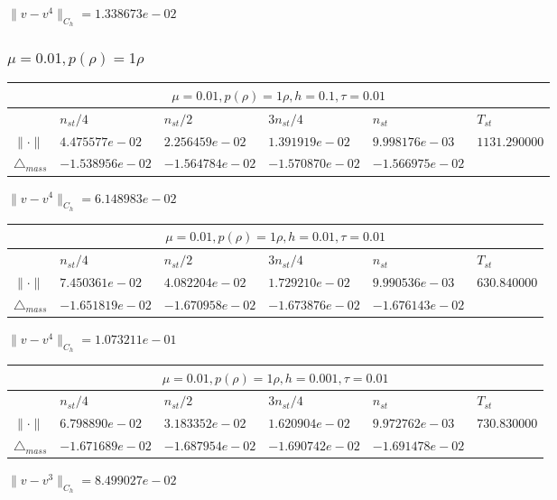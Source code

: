 \documentclass[12pt,a4paper]{article}
\begin{document}
$\|v-v^{4}\|_{C_h} = 1.338673e-02$

\subsubsection{$\mu = 0.01, p(\rho) = 1\rho $}

\begin{tabular}{*{6}{|l}|}
    \hline
     \\
    \hline
    &$n_{st}/4 $&$ n_{st}/2$&$3n_{st}/4$&$n_{st}$&$T_{st}$ \\
    \hline
$\|\cdot \|$& $4.475577e-02$ & $2.256459e-02$ & $1.391919e-02$ & $9.998176e-03$ &$1131.290000$\\
\hline
$\triangle_{mass}$& $-1.538956e-02$ & $-1.564784e-02$ & $-1.570870e-02$ & $-1.566975e-02$ &\\
\hline    
\end{tabular}

$\|v-v^{4}\|_{C_h} = 6.148983e-02$


\begin{tabular}{*{6}{|l}|}
    \hline
     \\
    \hline
    &$n_{st}/4 $&$ n_{st}/2$&$3n_{st}/4$&$n_{st}$&$T_{st}$ \\
    \hline
$\|\cdot \|$& $7.450361e-02$ & $4.082204e-02$ & $1.729210e-02$ & $9.990536e-03$ &$630.840000$\\
\hline
$\triangle_{mass}$& $-1.651819e-02$ & $-1.670958e-02$ & $-1.673876e-02$ & $-1.676143e-02$ &\\
\hline
\end{tabular}

$\|v-v^{4}\|_{C_h} = 1.073211e-01$


\begin{tabular}{*{6}{|l}|}
    \hline
     \\
    \hline
    &$n_{st}/4 $&$ n_{st}/2$&$3n_{st}/4$&$n_{st}$&$T_{st}$ \\
    \hline
    $\|\cdot \|$& $6.798890e-02$ & $3.183352e-02$ & $1.620904e-02$ & $9.972762e-03$ &$730.830000$\\
\hline
$\triangle_{mass}$& $-1.671689e-02$ & $-1.687954e-02$ & $-1.690742e-02$ & $-1.691478e-02$ &\\
\hline
\end{tabular}

$\|v-v^{3}\|_{C_h} = 8.499027e-02$
\end{document}
